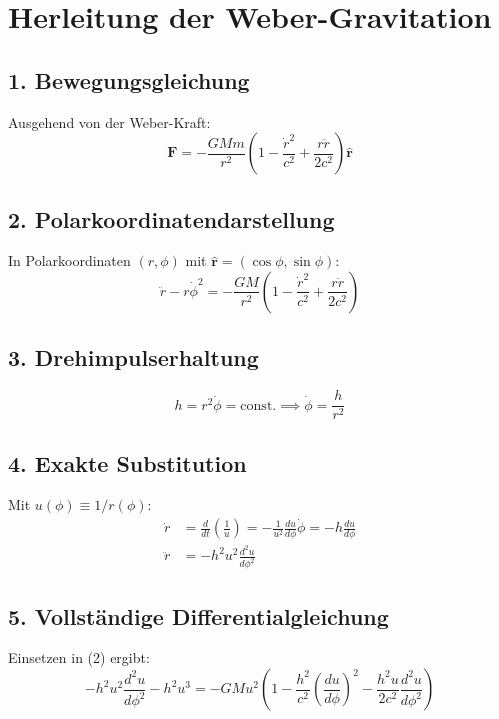 \section{Herleitung der Weber-Gravitation}

\subsection*{1. Bewegungsgleichung}
Ausgehend von der Weber-Kraft:
\begin{equation}
\bm{F} = -\frac{GMm}{r^2}\left(1 - \frac{\dot{r}^2}{c^2} + \frac{r\ddot{r}}{2c^2}\right)\bm{\hat{r}}
\end{equation}

\subsection*{2. Polarkoordinatendarstellung}
In Polarkoordinaten $(r,\phi)$ mit $\bm{\hat{r}} = (\cos\phi, \sin\phi)$:
\begin{equation}
\ddot{r} - r\dot{\phi}^2 = -\frac{GM}{r^2}\left(1 - \frac{\dot{r}^2}{c^2} + \frac{r\ddot{r}}{2c^2}\right)
\end{equation}

\subsection*{3. Drehimpulserhaltung}
\begin{equation}
h = r^2\dot{\phi} = \text{const.} \implies \dot{\phi} = \frac{h}{r^2}
\end{equation}

\subsection*{4. Exakte Substitution}
Mit $u(\phi) \equiv 1/r(\phi)$:
\begin{align}
\dot{r} &= \frac{d}{dt}\left(\frac{1}{u}\right) = -\frac{1}{u^2}\frac{du}{d\phi}\dot{\phi} = -h\frac{du}{d\phi} \\
\ddot{r} &= -h^2u^2\frac{d^2u}{d\phi^2}
\end{align}

\subsection*{5. Vollständige Differentialgleichung}
Einsetzen in (2) ergibt:
\begin{equation}
-h^2u^2\frac{d^2u}{d\phi^2} - h^2u^3 = -GMu^2\left(1 - \frac{h^2}{c^2}\left(\frac{du}{d\phi}\right)^2 - \frac{h^2u}{2c^2}\frac{d^2u}{d\phi^2}\right)
\end{equation}

